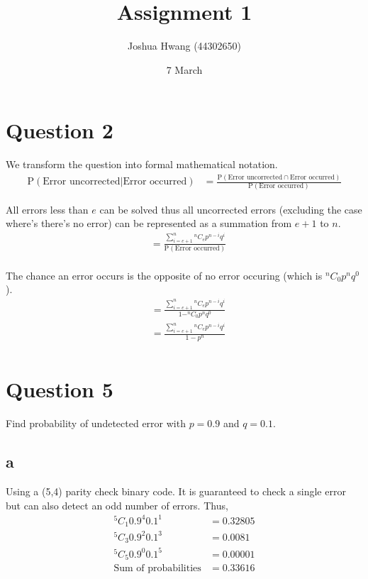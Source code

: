 \documentclass{article}
\title{Assignment 1}
\author{Joshua Hwang (44302650)}
\date{7 March}
\begin{document}
\maketitle

\section{Question 2}
We transform the question into formal mathematical notation.
\begin{align*}
    \text{P}(\text{Error uncorrected}|\text{Error occurred})
    &= \frac{\text{P}(\text{Error uncorrected} \cap \text{Error occurred})}
    {\text{P}(\text{Error occurred})}
\end{align*}

All errors less than $e$ can be solved thus all uncorrected errors (excluding
the case where's there's no error) can be represented as a summation from
$e+1$ to $n$.
\begin{align*}
    &= \frac{\sum^n_{i=e+1} {}^nC_e p^{n-i} q^i}{\text{P}(\text{Error occurred})} \\
\end{align*}

The chance an error occurs is the opposite of no error occuring (which is
$^nC_0 p^n q^0$).
\begin{align*}
    &= \frac{\sum^n_{i=e+1} {}^nC_e p^{n-i} q^i}
    {1 - ^nC_0 p^n q^0} \\
    &= \frac{\sum^n_{i=e+1} {}^nC_e p^{n-i} q^i}
    {1 - p^n} \\
\end{align*}

\section{Question 5}
Find probability of undetected error with $p=0.9$ and $q=0.1$.
\subsection{a}
Using a (5,4) parity check binary code. It is guaranteed to check a single
error but can also detect an odd number of errors. Thus, 
\begin{align*}
    ^5C_1 0.9^4 0.1^1 &= 0.32805 \\
    ^5C_3 0.9^2 0.1^3 &= 0.0081 \\
    ^5C_5 0.9^0 0.1^5 &= 0.00001 \\
    \text{Sum of probabilities} &= 0.33616 \\
\end{align*}
\end{document}
